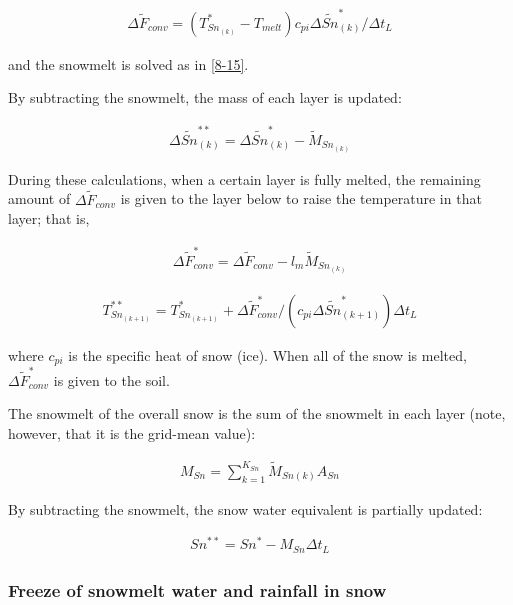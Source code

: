 \begin{eqnarray}
\Delta \widetilde{F}_{conv} = ( T_{Sn_{(k)}}^{\ast} - T_{melt} ) c_{pi}\Delta \widetilde{Sn}_{(k)}^{\ast}/\Delta t_L \label{8-17}
\end{eqnarray}

and the snowmelt is solved as in \ref{8-15}.

By subtracting the snowmelt, the mass of each layer is updated:

\begin{eqnarray}
\Delta \widetilde{Sn}_{(k)}^{\ast\ast} = \Delta \widetilde{Sn}_{(k)}^{\ast} - \widetilde{M}_{Sn_{(k)}} \label{8-18}
\end{eqnarray}

During these calculations, when a certain layer is fully melted, the remaining amount of \(\Delta \widetilde{F}_{conv}\) is given to the layer below to raise the temperature in that layer; that is,

\begin{eqnarray}
\Delta \widetilde{F}_{conv}^{\ast} = \Delta \widetilde{F}_{conv} - l_m \widetilde{M}_{Sn_{(k)}} \label{8-19}
\end{eqnarray}

\begin{eqnarray}
T_{Sn_{(k+1)}}^{\ast\ast}
 = T_{Sn_{(k+1)}}^{\ast} + \Delta \widetilde{F}_{conv}^{\ast} / (c_{pi} \Delta \widetilde{Sn}_{(k+1)}^{\ast}) \Delta t_L \label{8-20}
\end{eqnarray}

where \(c_{pi}\) is the specific heat of snow (ice). When all of the snow is melted, \(\Delta \widetilde{F}_{conv}^{\ast}\) is given to the soil.

The snowmelt of the overall snow is the sum of the snowmelt in each layer (note, however, that it is the grid-mean value):

\begin{eqnarray}
 M_{Sn} = \sum_{k=1}^{K_{Sn}} \widetilde{M}_{Sn(k)} A_{Sn} \label{8-21}
\end{eqnarray}

By subtracting the snowmelt, the snow water equivalent is partially updated:

\begin{eqnarray}
Sn^{\ast\ast} = Sn^{\ast} - M_{Sn} \Delta t_L \label{8-22}
\end{eqnarray}

\hypertarget{freeze-of-snowmelt-water-and-rainfall-in-snow}{%
\subsubsection{Freeze of snowmelt water and rainfall in snow}\label{freeze-of-snowmelt-water-and-rainfall-in-snow}}

